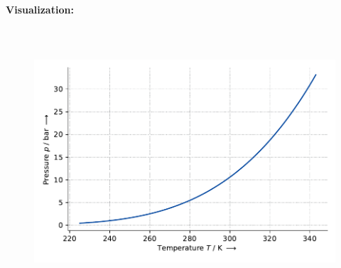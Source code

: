 \textbf{Visualization:}
%
\begin{figure}[!htp]
{\noindent\includegraphics[height=10cm, keepaspectratio]{figs/ref/ref_Ammonia_VaporPressure_EoSCubic_2.pdf}}
\end{figure}
%

\FloatBarrier
\newpage
